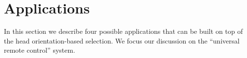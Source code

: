 \section{Applications}
\label{sec:applications}

In this section we describe four possible applications that can be built on top of the head orientation-based selection. We focus our discussion on the ``universal remote control'' system. 

